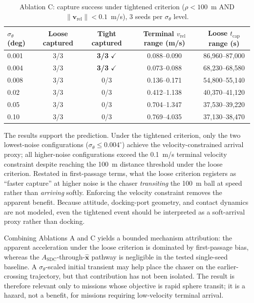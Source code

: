 \documentclass[preprint,3p,times]{elsarticle}
\begin{document}
\begin{table}[h]
\centering
\caption{Ablation C: capture success under tightened criterion ($\rho < 100$~m AND $\|\mathbf{v}_{\text{rel}}\| < 0.1$~m/s), 3 seeds per $\sigma_\theta$ level.}
\label{tab:abl_c}
\begin{tabular}{lcccc}
\toprule
$\sigma_\theta$ (deg) & Loose captured & Tight captured & Terminal $v_{\text{rel}}$ range (m/s) & Loose $t_{\text{cap}}$ range (s) \\
\midrule
0.001 & 3/3 & \textbf{3/3} $\checkmark$   & 0.088--0.090 & 86,960--87,000 \\
0.004 & 3/3 & \textbf{3/3} $\checkmark$   & 0.073--0.088 & 68,230--68,580 \\
0.008 & 3/3 & 0/3                          & 0.136--0.171 & 54,800--55,140 \\
0.02  & 3/3 & 0/3                          & 0.412--1.138 & 40,370--41,120 \\
0.05  & 3/3 & 0/3                          & 0.704--1.347 & 37,530--39,220 \\
0.10  & 3/3 & 0/3                          & 0.769--4.035 & 37,130--38,470 \\
\bottomrule
\end{tabular}
\end{table}

The results support the prediction. Under the tightened criterion, only the two lowest-noise configurations ($\sigma_\theta \le 0.004^\circ$) achieve the velocity-constrained arrival proxy; all higher-noise configurations exceed the 0.1~m/s terminal velocity constraint despite reaching the 100~m distance threshold under the loose criterion. Restated in first-passage terms, what the loose criterion registers as ``faster capture'' at higher noise is the chaser \emph{transiting} the 100~m ball at speed rather than \emph{arriving} softly. Enforcing the velocity constraint removes the apparent benefit. Because attitude, docking-port geometry, and contact dynamics are not modeled, even the tightened event should be interpreted as a soft-arrival proxy rather than docking.

Combining Ablations A and C yields a bounded mechanism attribution: the apparent acceleration under the loose criterion is dominated by first-passage bias, whereas the $A_{\text{SDC}}$-through-$\hat{\mathbf{x}}$ pathway is negligible in the tested single-seed baseline. A $\sigma_\theta$-scaled initial transient may help place the chaser on the earlier-crossing trajectory, but that contribution has not been isolated. The result is therefore relevant only to missions whose objective is rapid sphere transit; it is a hazard, not a benefit, for missions requiring low-velocity terminal arrival.
\end{document}
